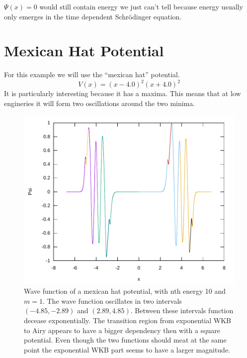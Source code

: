 \documentclass[11pt,DIV=10,final]{scrreprt} %
\begin{document}
{\begin{minipage}{\textwidth}
$\Psi(x) = 0$ would still contain energy we just can't tell because energy usually only
emerges in the time dependent Schrödinger equation.
\end{minipage}


\section{Mexican Hat Potential}
For this example we will use the ``mexican hat'' potential.
\[
  V(x) = {(x - 4.0)}^{2} {(x + 4.0)}^{2}
\]
It is particularly interesting because it has a maxima. This means that at low engineries it will form two oscillations around the two minima.
\begin{figure}[H]
  \centering
  \includegraphics[width=\textwidth]{plots/mexican-hat-10.pdf}
  \caption{Wave function of a mexican hat potential, with nth energy 10 and $m = 1$. The wave function oscillates in two intervals $(-4.85, -2.89)$ and $(2.89, 4.85)$. Between these intervals
  function decease exponentially. The transition region from exponential WKB to Airy appears to have a bigger dependency then with a square potential. Even though the two functions should meat at the same point the exponential WKB part seems to have a larger magnitude.}
\end{figure}

}
\end{document}
